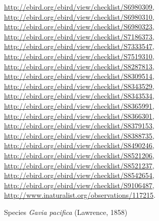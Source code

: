 \documentclass[9pt, article]{memoir}
\begin{document}
\begin{multicols}{2}
\url{http://ebird.org/ebird/view/checklist/S6980309}, 
\url{http://ebird.org/ebird/view/checklist/S6980310}, 
\url{http://ebird.org/ebird/view/checklist/S6980323}, 
\url{http://ebird.org/ebird/view/checklist/S7186373}, 
\url{http://ebird.org/ebird/view/checklist/S7333547}, 
\url{http://ebird.org/ebird/view/checklist/S7519310}, 
\url{http://ebird.org/ebird/view/checklist/S8287813}, 
\url{http://ebird.org/ebird/view/checklist/S8309514}, 
\url{http://ebird.org/ebird/view/checklist/S8343529}, 
\url{http://ebird.org/ebird/view/checklist/S8343534}, 
\url{http://ebird.org/ebird/view/checklist/S8365991}, 
\url{http://ebird.org/ebird/view/checklist/S8366301}, 
\url{http://ebird.org/ebird/view/checklist/S8379153}, 
\url{http://ebird.org/ebird/view/checklist/S8388735}, 
\url{http://ebird.org/ebird/view/checklist/S8490246}, 
\url{http://ebird.org/ebird/view/checklist/S8521206}, 
\url{http://ebird.org/ebird/view/checklist/S8521237}, 
\url{http://ebird.org/ebird/view/checklist/S8542654}, 
\url{http://ebird.org/ebird/view/checklist/S9106487}, 
\url{http://www.inaturalist.org/observations/117215}.

\vspace{6pt}\noindent\hspace{36pt}Species \textit{Gavia pacifica} (Lawrence, 1858)



\end{multicols}
\end{document}
